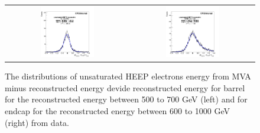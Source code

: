 \begin{figure}[bh]
  \begin{center}
    \begin{tabular}{cc}
      \includegraphics[width=0.45\textwidth]{chapters/Zprime/Saturation/images/ZToEE/data_B500-700_E600-1000/fit_BDTG_Barrel_Endcap_B_reg_nos.png} &
      \includegraphics[width=0.45\textwidth]{chapters/Zprime/Saturation/images/ZToEE/data_B500-700_E600-1000/fit_BDTG_Barrel_Endcap_E_reg_nos.png} \\
    \end{tabular}
    \caption{ The distributions of unsaturated HEEP electrons energy from MVA minus reconstructed energy devide reconstructed energy for barrel for the reconstructed energy between 500 to 700 GeV (left) and for endcap for the reconstructed energy between 600 to 1000 GeV (right) from data.}
    \label{fig:data_1}
  \end{center}
\end{figure}



